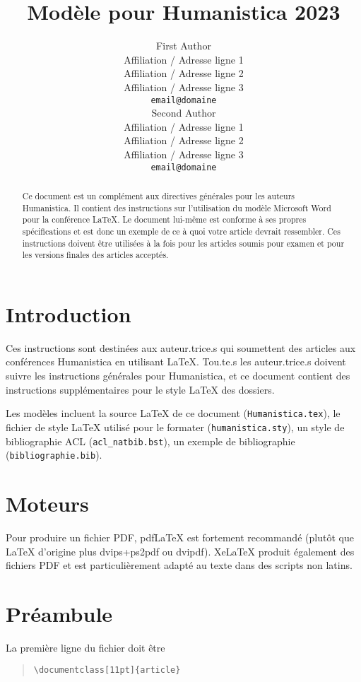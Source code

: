 \documentclass[11pt,french,hyphens]{article}
\title{Modèle pour Humanistica 2023}
\author{First Author \\
  Affiliation / Adresse ligne 1 \\
  Affiliation / Adresse ligne 2 \\
  Affiliation / Adresse ligne 3 \\
  \texttt{email@domaine} \\\And
  Second Author \\
  Affiliation / Adresse ligne 1 \\
  Affiliation / Adresse ligne 2 \\
  Affiliation / Adresse ligne 3 \\
  \texttt{email@domaine} \\}
\begin{document}
\maketitle
\begin{abstract}
Ce document est un complément aux directives générales pour les auteurs Humanistica. Il contient des instructions sur l'utilisation du modèle Microsoft Word pour la conférence \LaTeX{}. Le document lui-même est conforme à ses propres spécifications et est donc un exemple de ce à quoi votre article devrait ressembler. Ces instructions doivent être utilisées à la fois pour les articles soumis pour examen et pour les versions finales des articles acceptés.
\end{abstract}

\section{Introduction}

Ces instructions sont destinées aux auteur.trice.s qui soumettent des articles aux conférences Humanistica en utilisant \LaTeX. Tou.te.s les auteur.trice.s doivent suivre les instructions générales pour Humanistica, et ce document contient des instructions supplémentaires pour le style \LaTeX{} des dossiers.

Les modèles incluent la source \LaTeX{} de ce document (\texttt{Humanistica.tex}), le fichier de style \LaTeX{} utilisé pour le formater (\texttt{humanistica.sty}),
un style de bibliographie ACL (\texttt{acl\_natbib.bst}),
un exemple de bibliographie (\texttt{bibliographie.bib}).

\section{Moteurs}
Pour produire un fichier PDF, pdf\LaTeX{} est fortement recommandé (plutôt que \LaTeX{} d'origine plus dvips+ps2pdf ou dvipdf). Xe\LaTeX{} produit également des fichiers PDF et est particulièrement adapté au texte dans des scripts non latins.

\section{Préambule}

La première ligne du fichier doit être
\begin{quote}
\begin{verbatim}
\documentclass[11pt]{article}
\end{verbatim}
\end{quote}
\end{document}
